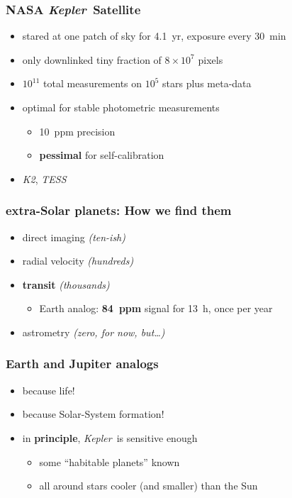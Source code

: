 \documentclass{beamer}
\renewcommand{\emph}[1]{\textbf{#1}}
\newcommand{\project}[1]{\textsl{#1}}
\newcommand{\Kepler}{\project{Kepler}}
\begin{document}
\begin{frame}
  \frametitle{NASA \Kepler\ Satellite}
  \begin{itemize}
  \item stared at one patch of sky for 4.1~yr, exposure every 30~min
  \item only downlinked tiny fraction of $8\times 10^7$ pixels
  \item $10^{11}$ total measurements on $10^5$ stars plus meta-data
  \item optimal for stable photometric measurements
    \begin{itemize}
    \item 10~ppm precision
    \item \emph{pessimal} for self-calibration
    \end{itemize}
  \item \project{K2}, \project{TESS}
  \end{itemize}
\end{frame}

\begin{frame}
  \frametitle{extra-Solar planets: How we find them}
  \begin{itemize}
  \item direct imaging \textit{(ten-ish)}
  \item radial velocity \textit{(hundreds)}
  \item \emph{transit} \textit{(thousands)}
    \begin{itemize}
    \item Earth analog: \emph{84~ppm} signal for 13~h, once per year
    \end{itemize}
  \item astrometry \textit{(zero, for now, but\ldots)}
  \end{itemize}
\end{frame}

\begin{frame}
  \frametitle{Earth and Jupiter analogs}
  \begin{itemize}
  \item because life!
  \item because Solar-System formation!
  \item in \emph{principle}, \Kepler\ is sensitive enough
    \begin{itemize}
    \item some ``habitable planets'' known
    \item all around stars cooler (and smaller) than the Sun
    \end{itemize}
  \end{itemize}
\end{frame}
\end{document}
